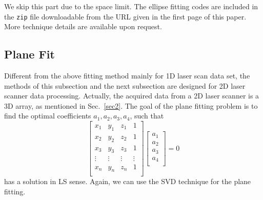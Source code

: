\documentclass[twocolumn]{IEEEtran}
\begin{document}
We skip this part due to the space limit. The ellipse fitting codes are included in the {\tt zip} file downloadable from the URL given in the first page of this paper. More technique details are available upon request.
%


 

\subsection{Plane Fit}
\label{sec3_planefit}



Different from the above fitting method mainly for 1D laser scan data set, the methods of this subsection and the next subsection are designed for 2D laser scanner data processing. Actually, the acquired data from a 2D laser scanner is a 3D  array, as mentioned in Sec.~\ref{sec2}.
The goal of the plane fitting problem is to find the optimal coefficients $a_1, a_2, a_3, a_4$, such that
$$  \begin{bmatrix}
    x_1 & y_1 & z_1 & 1 \\
    x_2 & y_2 & z_2 & 1 \\
    x_3 & y_3 & z_3 & 1 \\
    \vdots&\vdots&\vdots&\vdots \\
    x_n & y_n & z_n & 1  \\
    \end{bmatrix}
    \begin{bmatrix}
    a_1 \\ a_2\\ a_3\\ a_4 \\
    \end{bmatrix} =0 $$
has a solution in LS sense. Again, we can use the SVD technique for the plane fitting.
\end{document}
